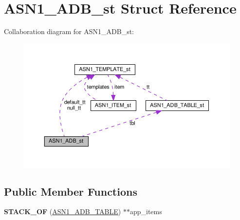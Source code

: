 \hypertarget{structASN1__ADB__st}{}\section{A\+S\+N1\+\_\+\+A\+D\+B\+\_\+st Struct Reference}
\label{structASN1__ADB__st}


Collaboration diagram for A\+S\+N1\+\_\+\+A\+D\+B\+\_\+st\+:
\nopagebreak
\begin{figure}[H]
\begin{center}
\leavevmode
\includegraphics[width=350pt]{structASN1__ADB__st__coll__graph}
\end{center}
\end{figure}
\subsection*{Public Member Functions}
\begin{DoxyCompactItemize}
\item 
\mbox{\label{structASN1__ADB__st_af70b602678a9eb933e47dfa284a6e178}} 
{\bfseries S\+T\+A\+C\+K\+\_\+\+OF} (\hyperlink{structASN1__ADB__TABLE__st}{A\+S\+N1\+\_\+\+A\+D\+B\+\_\+\+T\+A\+B\+LE}) $\ast$$\ast$app\+\_\+items
\end{DoxyCompactItemize}
